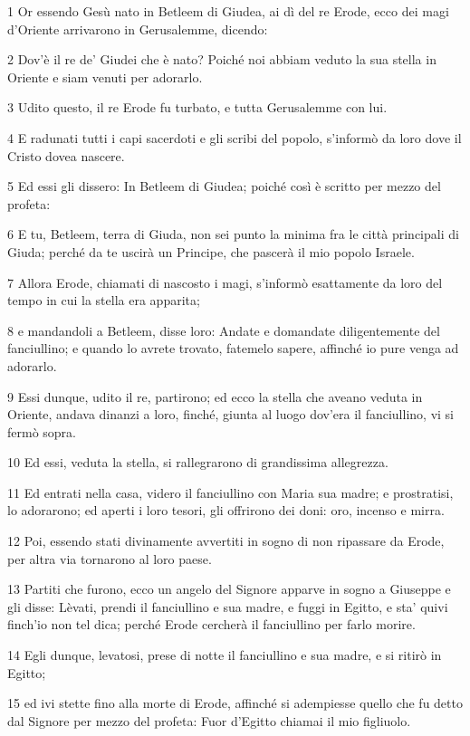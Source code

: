 \par 1 Or essendo Gesù nato in Betleem di Giudea, ai dì del re Erode, ecco dei magi d'Oriente arrivarono in Gerusalemme, dicendo:
\par 2 Dov'è il re de' Giudei che è nato? Poiché noi abbiam veduto la sua stella in Oriente e siam venuti per adorarlo.
\par 3 Udito questo, il re Erode fu turbato, e tutta Gerusalemme con lui.
\par 4 E radunati tutti i capi sacerdoti e gli scribi del popolo, s'informò da loro dove il Cristo dovea nascere.
\par 5 Ed essi gli dissero: In Betleem di Giudea; poiché così è scritto per mezzo del profeta:
\par 6 E tu, Betleem, terra di Giuda, non sei punto la minima fra le città principali di Giuda; perché da te uscirà un Principe, che pascerà il mio popolo Israele.
\par 7 Allora Erode, chiamati di nascosto i magi, s'informò esattamente da loro del tempo in cui la stella era apparita;
\par 8 e mandandoli a Betleem, disse loro: Andate e domandate diligentemente del fanciullino; e quando lo avrete trovato, fatemelo sapere, affinché io pure venga ad adorarlo.
\par 9 Essi dunque, udito il re, partirono; ed ecco la stella che aveano veduta in Oriente, andava dinanzi a loro, finché, giunta al luogo dov'era il fanciullino, vi si fermò sopra.
\par 10 Ed essi, veduta la stella, si rallegrarono di grandissima allegrezza.
\par 11 Ed entrati nella casa, videro il fanciullino con Maria sua madre; e prostratisi, lo adorarono; ed aperti i loro tesori, gli offrirono dei doni: oro, incenso e mirra.
\par 12 Poi, essendo stati divinamente avvertiti in sogno di non ripassare da Erode, per altra via tornarono al loro paese.
\par 13 Partiti che furono, ecco un angelo del Signore apparve in sogno a Giuseppe e gli disse: Lèvati, prendi il fanciullino e sua madre, e fuggi in Egitto, e sta' quivi finch'io non tel dica; perché Erode cercherà il fanciullino per farlo morire.
\par 14 Egli dunque, levatosi, prese di notte il fanciullino e sua madre, e si ritirò in Egitto;
\par 15 ed ivi stette fino alla morte di Erode, affinché si adempiesse quello che fu detto dal Signore per mezzo del profeta: Fuor d'Egitto chiamai il mio figliuolo.
